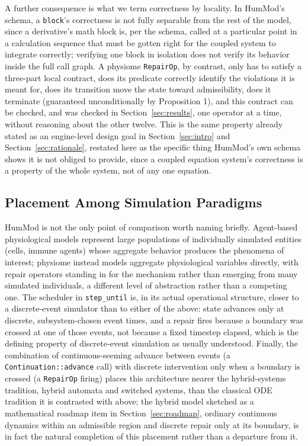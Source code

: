\documentclass[11pt]{article}
\begin{document}
A further consequence is what we term correctness by locality. In HumMod's schema, a \texttt{block}'s correctness is not fully separable from the rest of the model, since a derivative's math block is, per the schema, called at a particular point in a calculation sequence that must be gotten right for the coupled system to integrate correctly; verifying one block in isolation does not verify its behavior inside the full call graph. A physiome \texttt{RepairOp}, by contrast, only has to satisfy a three-part local contract, does its predicate correctly identify the violations it is meant for, does its transition move the state toward admissibility, does it terminate (guaranteed unconditionally by Proposition 1), and this contract can be checked, and was checked in Section~\ref{sec:results}, one operator at a time, without reasoning about the other twelve. This is the same property already stated as an engine-level design goal in Section~\ref{sec:intro} and Section~\ref{sec:rationale}, restated here as the specific thing HumMod's own schema shows it is not obliged to provide, since a coupled equation system's correctness is a property of the whole system, not of any one equation.

\subsection{Placement Among Simulation Paradigms}

HumMod is not the only point of comparison worth naming briefly. Agent-based physiological models represent large populations of individually simulated entities (cells, immune agents) whose aggregate behavior produces the phenomena of interest; physiome instead models aggregate physiological variables directly, with repair operators standing in for the mechanism rather than emerging from many simulated individuals, a different level of abstraction rather than a competing one. The scheduler in \texttt{step\_until} is, in its actual operational structure, closer to a discrete-event simulator than to either of the above: state advances only at discrete, subsystem-chosen event times, and a repair fires because a boundary was crossed at one of those events, not because a fixed timestep elapsed, which is the defining property of discrete-event simulation as usually understood. Finally, the combination of continuous-seeming advance between events (a \texttt{Continuation::advance} call) with discrete intervention only when a boundary is crossed (a \texttt{RepairOp} firing) places this architecture nearer the hybrid-systems tradition, hybrid automata and switched systems, than the classical ODE tradition it is contrasted with above; the hybrid model sketched as a mathematical roadmap item in Section~\ref{sec:roadmap}, ordinary continuous dynamics within an admissible region and discrete repair only at its boundary, is in fact the natural completion of this placement rather than a departure from it.
\end{document}
